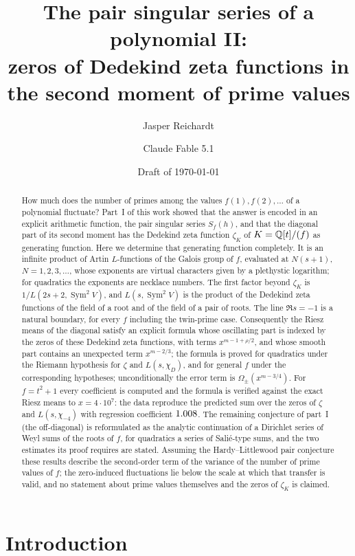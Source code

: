 \documentclass[11pt,a4paper]{article}
\title{The pair singular series of a polynomial II:\\ zeros of Dedekind zeta functions in the second
moment of prime values}
\author{Jasper Reichardt \and Claude Fable 5.1}
\date{Draft of \today}
\theoremstyle{remark}\newtheorem{remark}[theorem]{Remark}
\newcommand{\Sym}{\operatorname{Sym}}\newcommand{\Res}{\operatorname*{Res}}
\begin{document}
\maketitle

\begin{abstract}
How much does the number of primes among the values $f(1),f(2),\dots$ of a polynomial fluctuate? Part~I
of this work showed that the answer is encoded in an explicit arithmetic function, the pair singular
series $S_f(h)$, and that the diagonal part of its second moment has the Dedekind zeta function
$\zeta_K$ of $K=\mathbb{Q}[t]/(f)$ as generating function. Here we determine that generating function completely.
It is an infinite product of Artin $L$-functions of the Galois group of $f$, evaluated at $N(s+1)$,
$N=1,2,3,\dots$, whose exponents are virtual characters given by a plethystic logarithm; for quadratics the
exponents are necklace numbers. The first factor beyond $\zeta_K$ is $1/L(2s+2,\Sym^2V)$, and $L(s,\Sym^2V)$ is
the product of the Dedekind zeta functions of the field of a root and of the field of a pair of roots. The
line $\Re s=-1$ is a natural boundary, for every $f$ including the twin-prime case. Consequently the Riesz
means of the diagonal satisfy an explicit formula whose oscillating part is indexed by the zeros of these
Dedekind zeta functions, with terms $x^{m-1+\rho/2}$, and whose smooth part contains an unexpected term
$x^{m-2/3}$; the formula is proved for quadratics under the Riemann hypothesis for $\zeta$ and $L(s,\chi_D)$,
and for general $f$ under the corresponding hypotheses; unconditionally the error term is
$\Omega_\pm(x^{m-3/4})$. For $f=t^2+1$ every coefficient is computed and the formula is verified against the
exact Riesz means to $x=4\cdot10^7$: the data reproduce the predicted sum over the zeros of $\zeta$ and
$L(s,\chi_{-4})$ with regression coefficient $1.008$. The remaining conjecture of part~I (the off-diagonal)
is reformulated as the analytic continuation of a Dirichlet series of Weyl sums of the roots of $f$, for
quadratics a series of Sali\'e-type sums, and the two estimates its proof requires are stated. Assuming the
Hardy--Littlewood pair conjecture these results describe the second-order term of the variance of the number
of prime values of $f$; the zero-induced fluctuations lie below the scale at which that transfer is valid,
and no statement about prime values themselves and the zeros of $\zeta_K$ is claimed.
\end{abstract}

\section{Introduction}\label{sec:intro}
\end{document}
